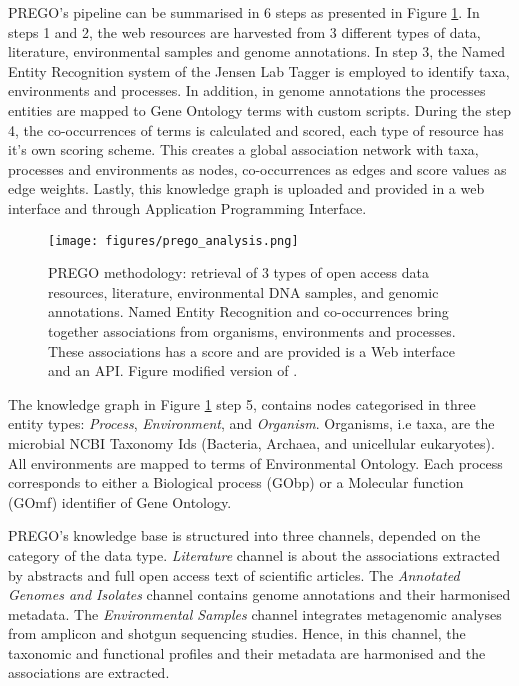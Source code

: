 PREGO's pipeline can be summarised in 6 steps as presented in Figure \ref{fig:prego-pipeline}.
In steps 1 and 2, the web resources are harvested from 3 different types of data,
literature, environmental samples and genome annotations. 
In step 3, the Named Entity Recognition system of the Jensen Lab Tagger is employed \parencite{jensen2016one}
to identify taxa, environments and processes. In addition, in genome annotations
the processes entities are mapped to Gene Ontology terms with custom scripts. 
During the step 4, the co-occurrences of terms is calculated and scored,
each type of resource has it's own scoring scheme. 
This creates a global association network with taxa, processes and environments as 
nodes, co-occurrences as edges and score values as edge weights. 
Lastly, this knowledge graph is uploaded and provided in a web interface 
and through Application Programming Interface.

   \begin{figure}[hbt!]
      \centering
      \texttt{[image: figures/prego\_analysis.png]}
      \caption[PREGO analysis methodology]{
         PREGO methodology: retrieval of 3 types of open access data resources, literature, environmental DNA samples, and genomic annotations. 
         Named Entity Recognition and co-occurrences bring together associations from organisms, environments and processes. 
         These associations has a score and are provided is a Web interface and an API. Figure modified version of \parencite{microorganisms10020293}.
      }
      \label{fig:prego-pipeline}
   \end{figure}

The knowledge graph in Figure \ref{fig:prego-pipeline} step 5, contains
nodes categorised in three entity types: \textit{Process}, \textit{Environment}, and \textit{Organism}. 
Organisms, i.e taxa, are the microbial NCBI Taxonomy Ids (Bacteria, Archaea, and unicellular eukaryotes).
All environments are mapped to terms of Environmental Ontology. 
Each process corresponds to either a Biological process (GObp) or a Molecular function (GOmf) identifier of Gene Ontology. 

PREGO's knowledge base is structured into three channels, depended on the category of the data type.
\textit{Literature} channel is about the associations extracted by abstracts and full open access text of scientific articles.
The \textit{Annotated Genomes and Isolates} channel contains genome annotations and their harmonised metadata.
The \textit{Environmental Samples} channel integrates metagenomic analyses from amplicon and shotgun sequencing studies. 
Hence, in this channel, the taxonomic and functional profiles and their metadata are harmonised and the associations are extracted.

